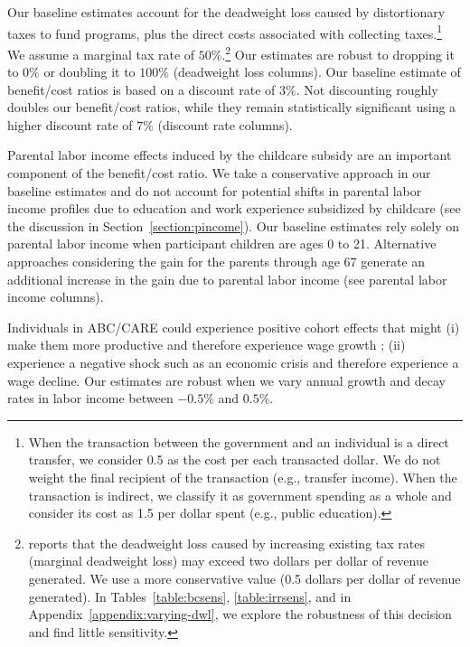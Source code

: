 Our baseline estimates account for the deadweight loss caused by distortionary taxes to fund programs, plus the direct costs associated with collecting taxes.\footnote{When the transaction between the government and an individual is a direct transfer, we consider 0.5 as the cost per each transacted dollar. We do not weight the final recipient of the transaction (e.g., transfer income). When the transaction is indirect, we classify it as government spending as a whole and consider its cost as 1.5 per dollar spent (e.g., public education).} We assume a marginal tax rate of $50\%$.\footnote{\citet{Feldstein_1999_REStat} reports that the deadweight loss caused by increasing existing tax rates (marginal deadweight loss) may exceed two dollars per dollar of revenue generated. We use a more conservative value (0.5 dollars per dollar of revenue generated). In Tables~\ref{table:bcsens}, \ref{table:irrsens}, and in  Appendix~\ref{appendix:varying-dwl}, we explore the robustness of this decision and find little sensitivity.} Our estimates are robust to dropping it to $0\%$ or doubling it to $100\%$ (deadweight loss columns). Our baseline estimate of benefit/cost ratios is based on a discount rate of $3\%$. Not discounting roughly doubles our benefit/cost ratios, while they remain statistically significant using a higher discount rate of $7\%$ (discount rate columns).

Parental labor income effects induced by the childcare subsidy are an important component of the benefit/cost ratio. We take a conservative approach in our baseline estimates and do not account for potential shifts in parental labor income profiles due to education and work experience subsidized by childcare (see the discussion in Section~\ref{section:pincome}). Our baseline estimates rely solely on parental labor income when participant children are ages 0 to 21. Alternative approaches considering the gain for the parents through age 67 generate an additional increase in the gain due to parental labor income (see parental labor income columns).

Individuals in ABC/CARE could experience positive cohort effects that might (i) make them more productive and therefore experience wage growth \citep{Lagakos_Moll_etal_2016_LifeCycle_NBER}; (ii) experience a negative shock such as an economic crisis and therefore experience a wage decline. Our estimates are robust when we vary annual growth and decay rates in labor income between $-0.5\%$ and $0.5\%$.

